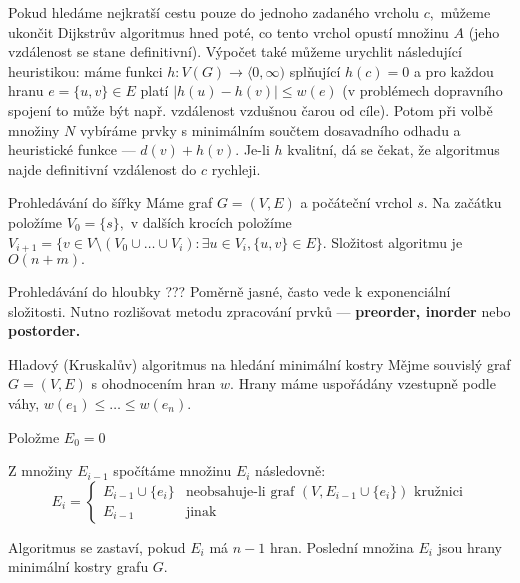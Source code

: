 \begin{poznamka}
Pokud hledáme nejkratší cestu pouze do jednoho zadaného vrcholu $c,$ můžeme ukončit Dijkstrův algoritmus hned poté, co tento vrchol opustí množinu $A$ (jeho vzdálenost se stane definitivní). Výpočet také můžeme urychlit následující heuristikou: máme funkci $h: V(G) \to \langle0,\infty)$ splňující $h(c)=0$ a pro každou hranu $e=\{u,v\} \in E$ platí $|h(u)-h(v)| \leq w(e)$ (v problémech dopravního spojení to může být např. vzdálenost vzdušnou čarou od cíle). Potom při volbě množiny $N$ vybíráme prvky s minimálním součtem dosavadního odhadu a heuristické funkce --- $d(v)+h(v).$ Je-li $h$ kvalitní, dá se čekat, že algoritmus najde definitivní vzdálenost do $c$ rychleji.
\end{poznamka}


\begin{algoritmusN}{Prohledávání do šířky}
Máme graf $G=(V,E)$ a počáteční vrchol $s.$ Na začátku položíme $V_0 = \{s\},$ v dalších krocích položíme $V_{i+1} = \{v \in V \setminus (V_0 \cup \dots \cup V_i): \exists u \in V_i, \{u,v\} \in E\}.$ Složitost algoritmu je $O(n+m).$
\end{algoritmusN}

\begin{algoritmusN}{Prohledávání do hloubky}
??? Poměrně jasné, často vede k exponenciální složitosti. Nutno rozlišovat metodu zpracování prvků --- \textbf{preorder, inorder} nebo \textbf{postorder.}
\end{algoritmusN}

\begin{algoritmusN}{Hladový (Kruskalův) algoritmus na hledání minimální kostry}
Mějme souvislý graf $G=(V,E)$ s ohodnocením hran $w.$ Hrany máme uspořádány vzestupně podle váhy, $w(e_1) \leq \dots \leq w(e_n).$
\begin{penumerate}
\item Položme $E_0=0$
\item Z množiny $E_{i-1}$ spočítáme množinu $E_i$ následovně:
$$
E_i =
\begin{cases}
E_{i-1} \cup \{e_i\} & \text{neobsahuje-li graf $(V,E_{i-1} \cup \{e_i\})$ kružnici}\\
E_{i-1} & \text{jinak}
\end{cases}
$$
\end{penumerate}
Algoritmus se zastaví, pokud $E_i$ má $n-1$ hran. Poslední množina $E_i$ jsou hrany minimální kostry grafu $G.$
\end{algoritmusN}

